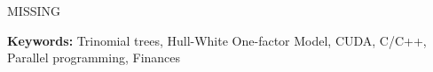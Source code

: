 MISSING

\noindent
\textbf{Keywords:}
Trinomial trees, Hull-White One-factor Model, CUDA, C/C++, Parallel programming, Finances